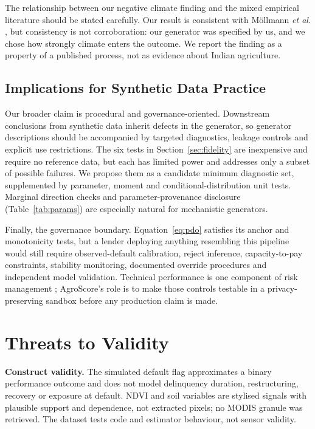 \documentclass[journal]{IEEEtran}
\begin{document}
The relationship between our negative climate finding and the mixed empirical literature should be stated carefully. Our result is consistent with M\"ollmann \textit{et al.} \cite{mollmann2020vegetation}, but consistency is not corroboration: our generator was specified by us, and we chose how strongly climate enters the outcome. We report the finding as a property of a published process, not as evidence about Indian agriculture.

\subsection{Implications for Synthetic Data Practice}
\label{sec:governance}
Our broader claim is procedural and governance-oriented. Downstream conclusions from synthetic data inherit defects in the generator, so generator descriptions should be accompanied by targeted diagnostics, leakage controls and explicit use restrictions. The six tests in Section~\ref{sec:fidelity} are inexpensive and require no reference data, but each has limited power and addresses only a subset of possible failures. We propose them as a candidate minimum diagnostic set, supplemented by parameter, moment and conditional-distribution unit tests. Marginal direction checks and parameter-provenance disclosure (Table~\ref{tab:params}) are especially natural for mechanistic generators.

Finally, the governance boundary. Equation~\eqref{eq:pdo} satisfies its anchor and monotonicity tests, but a lender deploying anything resembling this pipeline would still require observed-default calibration, reject inference, capacity-to-pay constraints, stability monitoring, documented override procedures and independent model validation. Technical performance is one component of risk management \cite{nist2023airmf}; AgroScore's role is to make those controls testable in a privacy-preserving sandbox before any production claim is made.

\section{Threats to Validity}
\label{sec:threats}

\textbf{Construct validity.} The simulated default flag approximates a binary performance outcome and does not model delinquency duration, restructuring, recovery or exposure at default. NDVI and soil variables are stylised signals with plausible support and dependence, not extracted pixels; no MODIS granule was retrieved. The dataset tests code and estimator behaviour, not sensor validity.
\end{document}
